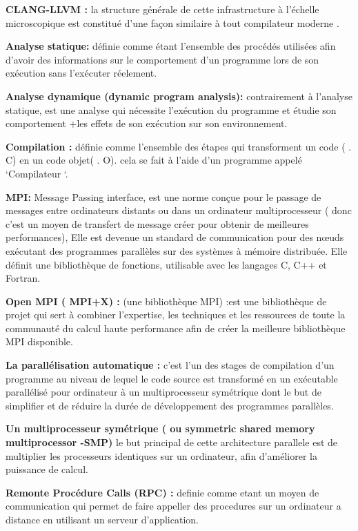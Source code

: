 \documentclass[12pt,titlepage]{article}
\begin{document}
\textbf{CLANG-LLVM :} la structure générale de cette infrastructure à l’échelle microscopique est constitué d’une façon similaire à tout compilateur moderne .\cite{clangllvm}

\textbf{ Analyse statique:} définie comme étant l'ensemble des procédés utilisées afin d'avoir des informations sur le comportement d’un programme lors de son exécution sans l’exécuter réelement.\cite{wiki}

\textbf{  Analyse dynamique (dynamic program analysis): } contrairement à l’analyse statique, est une analyse qui nécessite l’exécution du programme et étudie son comportement +les effets de son exécution sur son environnement.\cite{wiki}

\textbf{ Compilation : } définie comme l’ensemble des étapes qui transforment un code ( . C) en un code objet( . O). cela se fait à l’aide d’un programme appelé ‘Compilateur ‘.\cite{wiki}

\textbf{ MPI:} Message Passing interface, est une norme conçue pour le passage de messages entre ordinateurs distants ou dans un ordinateur multiprocesseur ( donc c’est un moyen de transfert de message créer pour obtenir de meilleures performances), Elle est devenue un standard de communication pour des nœuds exécutant des programmes parallèles sur des systèmes à mémoire distribuée. Elle définit une bibliothèque de fonctions, utilisable avec les langages C, C++ et Fortran.\cite{wiki}

\textbf{ Open MPI ( MPI+X) :} (une bibliothèque MPI) :est une bibliothèque de projet qui sert à combiner l'expertise, les techniques et les ressources de toute la communauté du calcul haute performance afin de créer la meilleure bibliothèque MPI disponible.\cite{wiki}


\textbf{ La parallélisation automatique :} c’est l’un des stages de compilation d’un programme au niveau de lequel le code source est transformé  en un exécutable parallélisé pour ordinateur à un multiprocesseur symétrique dont le but de simplifier et de réduire la durée de développement des programmes parallèles.\cite{wiki}

\textbf{ Un multiprocesseur symétrique ( ou symmetric shared memory multiprocessor -SMP) } 
le but principal de cette architecture parallele  est de multiplier les processeurs identiques sur un ordinateur, afin d’améliorer  la puissance de calcul.\cite{wiki}

\textbf{ Remonte Procédure Calls (RPC) : } definie comme etant un moyen de communication qui permet de faire appeller des procedures sur un ordinateur a distance en utilisant un serveur d'application.\cite{wiki}
\end{document}
